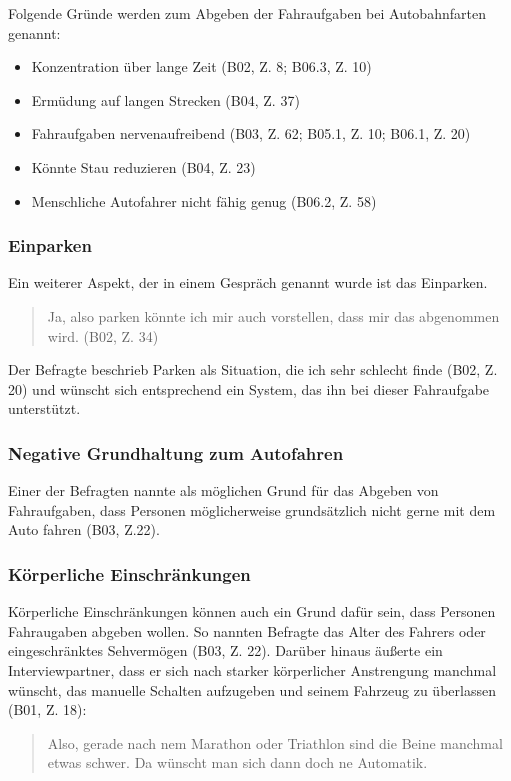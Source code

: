 \documentclass[12pt]{article}
\begin{document}
Folgende Gründe werden zum Abgeben der Fahraufgaben bei Autobahnfarten genannt:
\begin{itemize}
  \item Konzentration über lange Zeit (B02, Z. 8; B06.3, Z. 10)
  \item Ermüdung auf langen Strecken (B04, Z. 37)
  \item Fahraufgaben nervenaufreibend (B03, Z. 62; B05.1, Z. 10; B06.1, Z. 20)
  \item Könnte Stau reduzieren (B04, Z. 23)
  \item Menschliche Autofahrer nicht fähig genug (B06.2, Z. 58)
\end{itemize}

\subsubsection*{Einparken}
Ein weiterer Aspekt, der in einem Gespräch genannt wurde ist das Einparken.

\begin{quote}
  Ja, also parken könnte ich mir auch vorstellen, dass mir das abgenommen wird. (B02, Z. 34)
\end{quote}

Der Befragte beschrieb Parken als \glqq Situation, die ich sehr schlecht finde\grqq{} (B02, Z. 20) und wünscht sich entsprechend ein System, das ihn bei dieser Fahraufgabe unterstützt.

\subsubsection*{Negative Grundhaltung zum Autofahren}
Einer der Befragten nannte als möglichen Grund für das Abgeben von Fahraufgaben, dass Personen möglicherweise grundsätzlich nicht gerne mit dem Auto fahren (B03, Z.22).

\subsubsection*{Körperliche Einschränkungen}
Körperliche Einschränkungen können auch ein Grund dafür sein, dass Personen Fahraugaben abgeben wollen. So nannten Befragte das Alter des Fahrers oder eingeschränktes Sehvermögen (B03, Z. 22). Darüber hinaus äußerte ein Interviewpartner, dass er sich nach starker körperlicher Anstrengung manchmal wünscht, das manuelle Schalten aufzugeben und seinem Fahrzeug zu überlassen (B01, Z. 18):

\begin{quote}
  Also, gerade nach nem Marathon oder Triathlon sind die Beine manchmal etwas schwer. Da wünscht man sich dann doch ne Automatik.
\end{quote}
\end{document}

